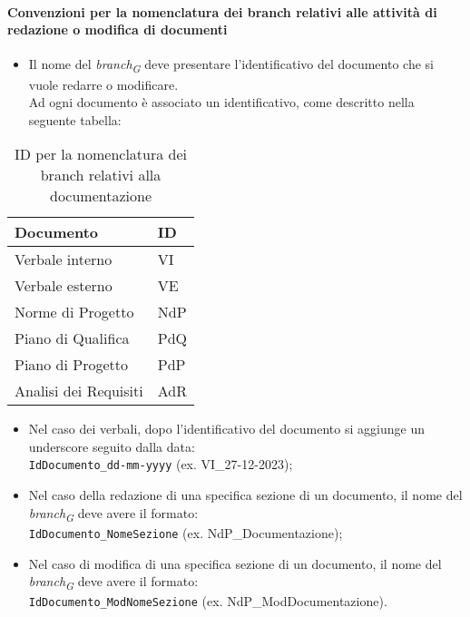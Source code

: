 \paragraph*{\hypertarget{par:convezioninomenclaturabranchdocumenti}{\textbf{Convenzioni per la nomenclatura dei branch relativi alle attività di redazione o modifica di documenti}}}

\begin{itemize}
    \item Il nome del \textit{branch}\textsubscript{\textit{G}} deve presentare l'identificativo del documento che si vuole redarre o modificare. \\
    Ad ogni documento è associato un identificativo, come descritto nella seguente tabella:
\end{itemize}

\begin{table}[H]
    \centering
    \begin{tabular}{|C{4cm}|C{2cm}|}
        \hline
        \textbf{Documento} & \textbf{ID} \\
        \hline \hline
        Verbale interno         & VI  \\
        Verbale esterno         & VE  \\
        Norme di Progetto       & NdP \\
        Piano di Qualifica      & PdQ \\
        Piano di Progetto       & PdP \\ 
        Analisi dei Requisiti   & AdR \\
        \hline
    \end{tabular}
    \caption{ID per la nomenclatura dei branch relativi alla documentazione}
\end{table}

\begin{itemize}
    \item Nel caso dei verbali, dopo l'identificativo del documento si aggiunge un underscore seguito dalla data: \\
    \texttt{IdDocumento\_dd-mm-yyyy} (ex. VI\_27-12-2023);
    \item Nel caso della redazione di una specifica sezione di un documento, il nome del \textit{branch}\textsubscript{\textit{G}} deve avere il formato: \\
    \texttt{IdDocumento\_NomeSezione} (ex. NdP\_Documentazione);
    \item Nel caso di modifica di una specifica sezione di un documento, il nome del \textit{branch}\textsubscript{\textit{G}} deve avere il formato: \\
    \texttt{IdDocumento\_ModNomeSezione} (ex. NdP\_ModDocumentazione).
\end{itemize}

